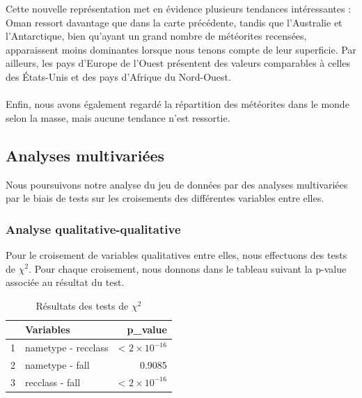\documentclass[12pt]{article}
\begin{document}
Cette nouvelle représentation met en évidence plusieurs tendances intéressantes : Oman ressort davantage que dans la carte précédente, tandis que l’Australie et l’Antarctique, bien qu’ayant un grand nombre de météorites recensées, apparaissent moins dominantes lorsque nous tenons compte de leur superficie. Par ailleurs, les pays d’Europe de l’Ouest présentent des valeurs comparables à celles des États-Unis et des pays d’Afrique du Nord-Ouest.\\
\\
Enfin, nous avons également regardé la répartition des météorites dans le monde selon la masse, mais aucune tendance n'est ressortie.

\subsection{Analyses multivariées}
Nous poursuivons notre analyse du jeu de données par des analyses multivariées par le biais de tests sur les croisements des différentes variables entre elles.
\subsubsection*{Analyse qualitative-qualitative}

Pour le croisement de variables qualitatives entre elles, nous effectuons des tests de $\chi^2$. Pour chaque croisement, nous donnons dans le tableau suivant la p-value associée au résultat du test.
\begin{table}[H]
\centering
\begin{tabular}{rlr}
  \hline
 & Variables & p\_value \\ 
  \hline
1 & nametype - recclass & < $2\times 10^{-16}$  \\ 
  2 & nametype - fall & 0.9085 \\ 
  3 & recclass - fall & < $2\times 10^{-16}$  \\ 
   \hline
\end{tabular}
\caption{Résultats des tests de $\chi^2$}
\end{table}
\end{document}

